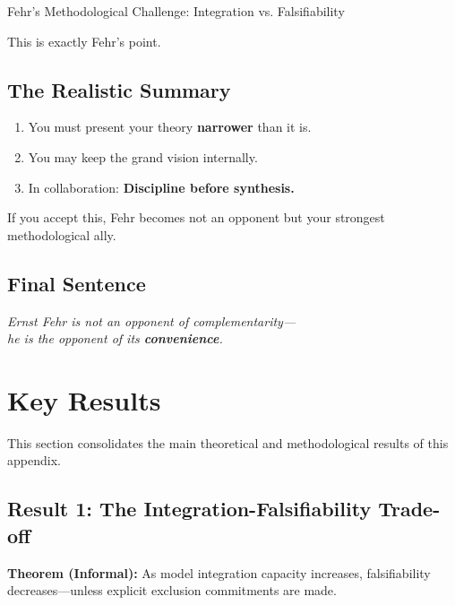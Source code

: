 \begin{chapter}{Fehr's Methodological Challenge: Integration vs. Falsifiability}
\begin{tcolorbox}[colback=gray!10!white,colframe=gray!75!black,title=\textbf{What You Could Say to Fehr}]
\end{tcolorbox}

This is exactly Fehr's point.

\subsection{The Realistic Summary}

\begin{enumerate}
    \item You must present your theory \textbf{narrower} than it is.
    \item You may keep the grand vision internally.
    \item In collaboration: \textbf{Discipline before synthesis.}
\end{enumerate}

If you accept this, Fehr becomes not an opponent but your strongest methodological ally.

\subsection{Final Sentence}

\begin{tcolorbox}[colback=blue!10!white,colframe=blue!75!black]
\begin{center}
\large
\textit{Ernst Fehr is not an opponent of complementarity---\\
he is the opponent of its \textbf{convenience}.}
\end{center}
\end{tcolorbox}


\section{Key Results}
\label{sec:results}

This section consolidates the main theoretical and methodological results of this appendix.

\subsection{Result 1: The Integration-Falsifiability Trade-off}

\begin{tcolorbox}[colback=gray!10!white,colframe=gray!75!black]
\textbf{Theorem (Informal):} As model integration capacity increases, falsifiability decreases---unless explicit exclusion commitments are made.


\end{tcolorbox}
\end{chapter}
